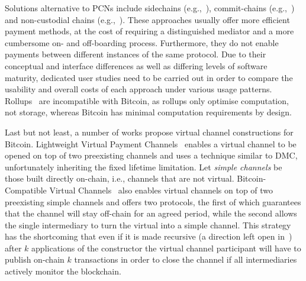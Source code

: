 
  Solutions alternative to PCNs include side\-chains
  (e.g.,~\cite{BCDF+14,sidechains,KiaZin18}), commit-chains
  (e.g.,~\cite{plasma}) and non-cu\-sto\-di\-al chains
  (e.g.,~\cite{plasma,konstantopoulos2019plasma,plasma-lower-bounds}). These
  approaches usually offer more efficient payment methods, at the cost of
  requiring a distinguished mediator and a more cumbersome on- and off-boarding
  process. Furthermore, they do not enable payments between different instances
  of the same protocol. Due to their conceptual and interface differences as
  well as differing levels of software maturity, dedicated user studies need to
  be carried out in order to compare the usability and overall costs of each
  approach under various usage patterns. Rollups~\cite{ZKRollup,Optimism} are
  incompatible with Bitcoin, as rollups only optimise computation, not storage,
  whereas Bitcoin has minimal computation requirements by design.

  Last but not least, a number of works propose virtual channel constructions
  for Bitcoin. Lightweight Virtual Payment
  Channels~\cite{10.1007/978-3-030-65411-5_18} enables a virtual channel to be
  opened on top of two preexisting channels and uses a technique similar to DMC,
  unfortunately inheriting the fixed lifetime limitation.
  Let \emph{simple channels} be those built directly on-chain, i.e., channels that are not
  virtual.
  Bitcoin-Compatible Virtual Channels~\cite{9519487} also enables
  virtual channels on top of two preexisting simple channels
  and offers two protocols, the first of which guarantees that the channel will
  stay off-chain for an agreed period, while the second allows the single intermediary
  to turn the virtual into a simple channel.
  This strategy has the shortcoming that even if it is made
  recursive (a direction left open in~\cite{9519487}) after $k$
  applications of the constructor the virtual channel participant will have to
  publish on-chain $k$ transactions in order to close the channel if all
  intermediaries actively monitor the blockchain.

